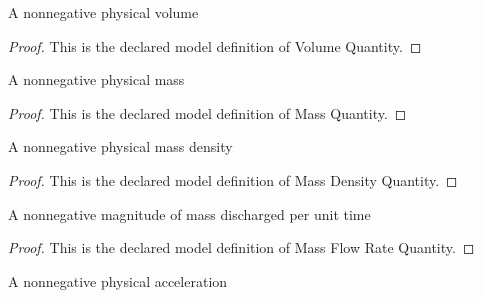 \begin{definition}
  \label{def:physics:phyx-mini-0238:phyxminiproblems-problemphyxmini0238-volumequantity}
  A nonnegative physical volume
\end{definition}
\begin{proof}
  This is the declared model definition of Volume Quantity.
\end{proof}
\begin{definition}
  \label{def:physics:phyx-mini-0238:phyxminiproblems-problemphyxmini0238-massquantity}
  A nonnegative physical mass
\end{definition}
\begin{proof}
  This is the declared model definition of Mass Quantity.
\end{proof}
\begin{definition}
  \label{def:physics:phyx-mini-0238:phyxminiproblems-problemphyxmini0238-massdensityquantity}
  A nonnegative physical mass density
\end{definition}
\begin{proof}
  This is the declared model definition of Mass Density Quantity.
\end{proof}
\begin{definition}
  \label{def:physics:phyx-mini-0238:phyxminiproblems-problemphyxmini0238-massflowratequantity}
  A nonnegative magnitude of mass discharged per unit time
\end{definition}
\begin{proof}
  This is the declared model definition of Mass Flow Rate Quantity.
\end{proof}
\begin{definition}
  \label{def:physics:phyx-mini-0238:phyxminiproblems-problemphyxmini0238-accelerationquantity}
  A nonnegative physical acceleration
\end{definition}
